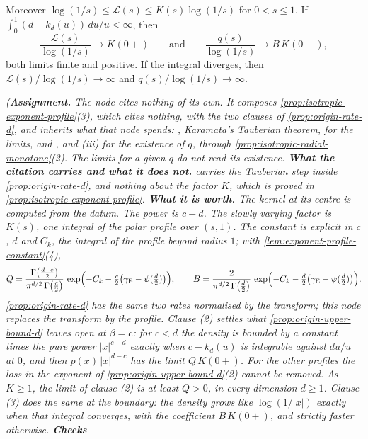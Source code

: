 \begin{proposition}
\begin{enumerate}
\[\]
Moreover $\log(1/s) \le \mathcal{L}(s) \le K(s)\log(1/s)$ for $0 < s \le 1$. If
$\int_0^1 (d - k_d(u))\,du/u < \infty$, then
\[
  \frac{\mathcal{L}(s)}{\log(1/s)} \to K(0{+})
  \qquad\text{and}\qquad
  \frac{q(s)}{\log(1/s)} \to B\,K(0{+}) ,
\]
both limits finite and positive. If the integral diverges, then
$\mathcal{L}(s)/\log(1/s) \to \infty$ and $q(s)/\log(1/s) \to \infty$.
\end{enumerate}
\statusA\quad{}\quad{}\quad{}\quad{}\quad\emph{(\textbf{Assignment.}
The node cites nothing of its own. It composes \ref{prop:isotropic-exponent-profile}(3), which
cites nothing, with the two clauses of \ref{prop:origin-rate-d}, and inherits what that node
spends: , Karamata's Tauberian theorem, for the limits, and , 
and (iii) for the existence of $q$, through
\ref{prop:isotropic-radial-monotone}(2). The limits for a given $q$ do not read its existence.
\textbf{What the citation carries and what it does not.}  carries the Tauberian step
inside \ref{prop:origin-rate-d}, and nothing about the factor $K$, which is proved in
\ref{prop:isotropic-exponent-profile}. \textbf{What it is worth.} The kernel at its centre is
computed from the datum. The power is $c - d$. The slowly varying factor is $K(s)$, one integral
of the polar profile over $(s,1)$. The constant is explicit in $c$, $d$ and $C_k$, the integral
of the profile beyond radius $1$; with \ref{lem:exponent-profile-constant}(4),
\[
  Q = \frac{\Gamma\bigl(\tfrac{d-c}{2}\bigr)}{\pi^{d/2}\,\Gamma\bigl(\tfrac c2\bigr)}\,
     \exp\Bigl(-C_k - \tfrac c2\bigl(\gamma_{\mathrm E} - \psi(\tfrac d2)\bigr)\Bigr), \qquad
  B = \frac{2}{\pi^{d/2}\,\Gamma\bigl(\tfrac d2\bigr)}\,
     \exp\Bigl(-C_k - \tfrac d2\bigl(\gamma_{\mathrm E} - \psi(\tfrac d2)\bigr)\Bigr) .
\]
\ref{prop:origin-rate-d} has the same two rates normalised by the transform; this node replaces
the transform by the profile. Clause (2) settles what \ref{prop:origin-upper-bound-d} leaves
open at $\beta = c$: for $c < d$ the density is bounded by a constant times the pure power
$|x|^{c-d}$ exactly when $c - k_d(u)$ is integrable against $du/u$ at $0$, and then
$p(x)\,|x|^{d-c}$ has the limit $Q\,K(0{+})$. For the other profiles the loss in the exponent of
\ref{prop:origin-upper-bound-d}(2) cannot be removed. As $K \ge 1$, the limit of clause (2) is at
least $Q > 0$, in every dimension $d \ge 1$. Clause (3) does the same at the
boundary: the density grows like $\log(1/|x|)$ exactly when that integral converges, with the
coefficient $B\,K(0{+})$, and strictly faster otherwise. \textbf{Checks}
}
\end{proposition}
